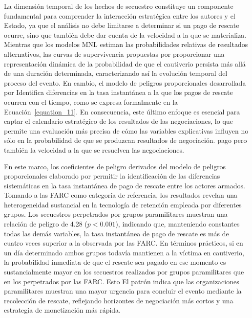 \documentclass[12pt]{article}
\providecommand{\textcite}{\citet}
\theoremstyle{definition}
\theoremstyle{remark}
\newcommand{\1}{\mathbf{1}}
\begin{document}
La dimensión temporal de los hechos de secuestro constituye un componente fundamental para comprender la interacción estratégica entre los autores y el Estado, ya que el análisis no debe limitarse a determinar si un pago de rescate ocurre, sino que también debe dar cuenta de la velocidad a la que se materializa. Mientras que los modelos MNL estiman las probabilidades relativas de resultados alternativos, las curvas de supervivencia propuestas por \textcite{Bradburn2003} proporcionar una representación dinámica de la probabilidad de que el cautiverio persista más allá de una duración determinada, caracterizando así la evolución temporal del proceso del evento. En cambio, el modelo de peligros proporcionales desarrollada por \textcite{Cox1972} Identifica diferencias en la tasa instantánea a la que los pagos de rescate ocurren con el tiempo, como se expresa formalmente en la Ecuación~\ref{equation_11}. En consecuencia, este último enfoque es esencial para captar el calendario estratégico de los resultados de las negociaciones, lo que permite una evaluación más precisa de cómo las variables explicativas influyen no sólo en la probabilidad de que se produzcan resultados de negociación. pago pero también la velocidad a la que se resuelven las negociaciones.

En este marco, los coeficientes de peligro derivados del modelo de peligros proporcionales elaborado por \textcite{Cox1972} permitir la identificación de las diferencias sistemáticas en la tasa instantánea de pago de rescate entre los actores armados. Tomando a las FARC como categoría de referencia, los resultados revelan una heterogeneidad sustancial en la tecnología de retención empleada por diferentes grupos. Los secuestros perpetrados por grupos paramilitares muestran una relación de peligro de 4.28 ($p<0.001$), indicando que, manteniendo constantes todas las demás variables, la tasa instantánea de pago de rescate es más de cuatro veces superior a la observada por las FARC. En términos prácticos, si en un día determinado ambos grupos todavía mantienen a la víctima en cautiverio, la probabilidad inmediata de que el rescate sea pagado en ese momento es sustancialmente mayor en los secuestros realizados por grupos paramilitares que en los perpetrados por las FARC. Esto El patrón indica que las organizaciones paramilitares muestran una mayor urgencia para concluir el evento mediante la recolección de rescate, reflejando horizontes de negociación más cortos y una estrategia de monetización más rápida. 
\end{document}
